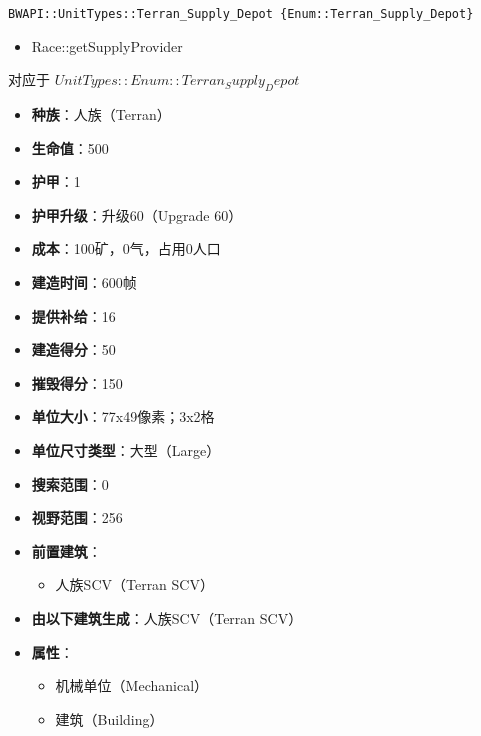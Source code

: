 \begin{tcolorbox}[colback=white, colframe=black!60!white, title=Terran\_Supply\_Depot(), arc=0mm]
    \begin{verbatim}
BWAPI::UnitTypes::Terran_Supply_Depot {Enum::Terran_Supply_Depot}
    \end{verbatim}
    \begin{refer}
        \begin{itemize}
            \item Race::getSupplyProvider
        \end{itemize}
    \end{refer}
    对应于  $ UnitTypes::Enum::Terran_Supply_Depot $ 
    \begin{itemize}
        \item \textbf{种族}：人族（Terran）
        \item \textbf{生命值}：500
        \item \textbf{护甲}：1
        \item \textbf{护甲升级}：升级60（Upgrade 60）
        \item \textbf{成本}：100矿，0气，占用0人口
        \item \textbf{建造时间}：600帧
        \item \textbf{提供补给}：16
        \item \textbf{建造得分}：50
        \item \textbf{摧毁得分}：150
        \item \textbf{单位大小}：77x49像素；3x2格
        \item \textbf{单位尺寸类型}：大型（Large）
        \item \textbf{搜索范围}：0
        \item \textbf{视野范围}：256
        \item \textbf{前置建筑}：
            \begin{itemize}
                \item 人族SCV（Terran SCV）
            \end{itemize}
        \item \textbf{由以下建筑生成}：人族SCV（Terran SCV）
        \item \textbf{属性}：
            \begin{itemize}
                \item 机械单位（Mechanical）
                \item 建筑（Building）
            \end{itemize}
    \end{itemize}
\end{tcolorbox}

